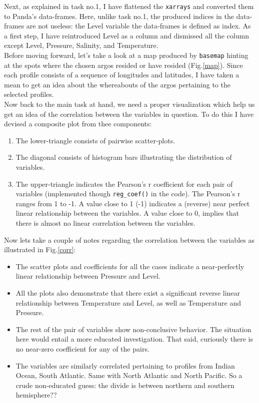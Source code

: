 \documentclass[12pt]{article}
\begin{document}
Next, as explained in task no.1, I have flattened the \verb|xarrays| 
and converted them to Panda's data-frames. Here, unlike
task no.1, the produced indices in the data-frames are not useless: 
the Level variable the data-frames is defined as 
index. As a first step, I have reintroduced Level as a column and 
dismissed all the column except Level, Pressure, 
Salinity, and Temperature.\\

Before moving forward, let's take a look at a map produced by 
\verb|basemap| hinting at the spots where
the chosen argos resided or have resided (Fig.\ref{map}). 
Since each profile consists of a sequence of longitudes and 
latitudes,
I have taken a mean to get an idea about the whereabouts of 
the argos pertaining to the selected profiles.\\

Now back to the main task at hand, we need a proper 
visualization which help us get an idea of the correlation
between the variables in question. To do this I have 
devised a composite plot from thee components: 

\begin{enumerate}
    \item The lower-triangle consists of pairwise scatter-plots.
    \item The diagonal consists of histogram bars illustrating 
    the distribution of variables.
    \item The upper-triangle indicates the Pearson's r 
    coefficient for each pair of variables 
    (implemented though \verb|reg_coef()| 
    in the code). The Pearson's r ranges from 1 to -1.
    A value close to 1 (-1) indicates a (reverse) near
    perfect linear relationship between the variables.
    A value close to 0, implies that there is almost no 
    linear correlation between the variables.
\end{enumerate}



Now lets take a couple of notes regarding the
correlation between the variables as illustrated in
Fig.\ref{corr}:
    
\begin{itemize}
    \item The scatter plots and coefficients for all the cases 
    indicate a near-perfectly
    linear relationship between Pressure and Level. 
    \item All the plots also demonstrate that there exist a 
    significant reverse linear relationship between Temperature 
    and Level,
    as well as Temperature and Pressure.
    \item The rest of the pair of variables show non-conclusive 
    behavior. The situation here would entail a more educated 
    investigation. That said, curiously there is no near-zero 
    coefficient for any of the pairs.
    \item The variables are similarly correlated pertaining to 
    profiles from Indian Ocean, South Atlantic. Same with North Atlantic
    and North Pacific. So a crude non-educated guess: the divide 
    is between northern and southern hemisphere??
\end{itemize}
\end{document}
